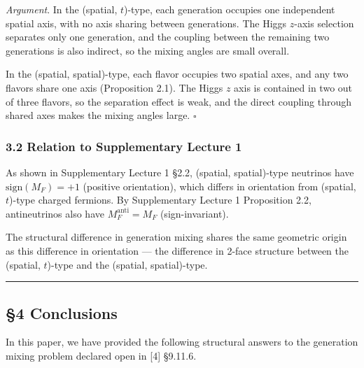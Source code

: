 \documentclass[
  a4paper,11pt]{article}
\begin{document}
\emph{Argument}. In the (spatial, \(t\))-type, each generation occupies
one independent spatial axis, with no axis sharing between generations.
The Higgs \(z\)-axis selection separates only one generation, and the
coupling between the remaining two generations is also indirect, so the
mixing angles are small overall.

In the (spatial, spatial)-type, each flavor occupies two spatial axes,
and any two flavors share one axis (Proposition 2.1). The Higgs \(z\)
axis is contained in two out of three flavors, so the separation effect
is weak, and the direct coupling through shared axes makes the mixing
angles large. \(\square\)

\subsubsection{3.2 Relation to Supplementary Lecture
1}\label{relation-to-supplementary-lecture-1}

As shown in Supplementary Lecture 1 §2.2, (spatial, spatial)-type
neutrinos have \(\text{sign}(M_F) = +1\) (positive orientation), which
differs in orientation from (spatial, \(t\))-type charged fermions. By
Supplementary Lecture 1 Proposition 2.2, antineutrinos also have
\(M_F^{\text{anti}} = M_F\) (sign-invariant).

The structural difference in generation mixing shares the same geometric
origin as this difference in orientation --- the difference in 2-face
structure between the (spatial, \(t\))-type and the (spatial,
spatial)-type.

\begin{center}\rule{0.5\linewidth}{0.5pt}\end{center}

\subsection{§4 Conclusions}\label{conclusions}

In this paper, we have provided the following structural answers to the
generation mixing problem declared open in {[}4{]} §9.11.6.
\end{document}
